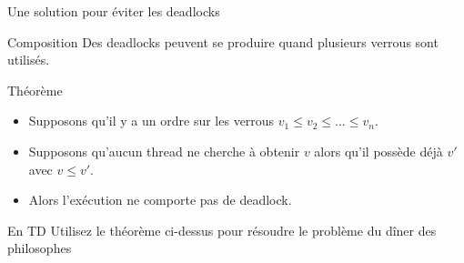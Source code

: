 
\begingroup

\begin{frame}{Une solution pour éviter les deadlocks}

  \vFill

  \begin{alertblock}{Composition}
    Des deadlocks peuvent se produire quand plusieurs verrous sont utilisés.
  \end{alertblock}

  \vFill

  \begin{block}{Théorème}
    \begin{itemize}
    \item Supposons qu'il y a un ordre sur les verrous $v_1 \le v_2 \le \dots \le v_n$.
    \item Supposons qu'aucun thread ne cherche à obtenir $v$ alors qu'il possède déjà $v'$ avec $v\le v'$.
    \item Alors l'exécution ne comporte pas de deadlock.
    \end{itemize}
  \end{block}

  \vFill

  \begin{alertblock}{En TD}
    Utilisez le théorème ci-dessus pour résoudre le problème du dîner des philosophes
  \end{alertblock}

  \vFill

\end{frame}

\endgroup
\endinput
